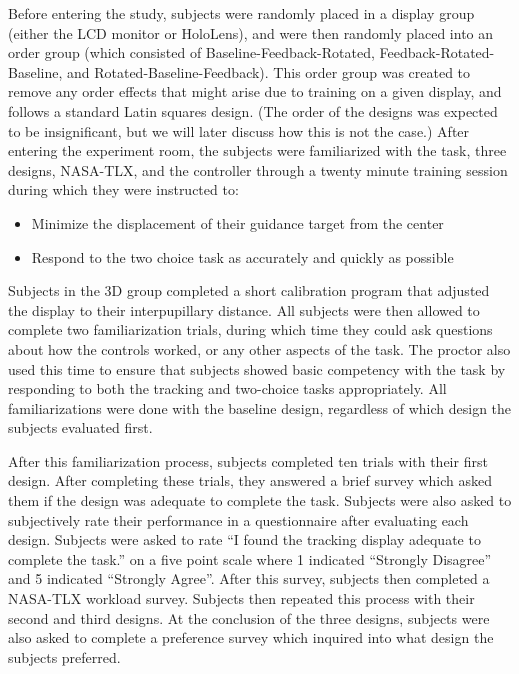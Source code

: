 Before entering the study, subjects were randomly placed in a display group (either the LCD monitor or HoloLens), and were then randomly placed into an order group (which consisted of Baseline-Feedback-Rotated, Feedback-Rotated-Baseline, and Rotated-Baseline-Feedback).
This order group was created to remove any order effects that might arise due to training on a given display, and follows a standard Latin squares design.
(The order of the designs was expected to be insignificant, but we will later discuss how this is not the case.)
After entering the experiment room, the subjects were familiarized with the task, three designs, NASA-TLX, and the controller through a twenty minute training session during which they were instructed to:
\begin{itemize}
    \item Minimize the displacement of their guidance target from the center
    \item Respond to the two choice task as accurately and quickly as possible
\end{itemize}

Subjects in the 3D group completed a short calibration program that adjusted the display to their interpupillary distance.
All subjects were then allowed to complete two familiarization trials, during which time they could ask questions about how the controls worked, or any other aspects of the task.
The proctor also used this time to ensure that subjects showed basic competency with the task by responding to both the tracking and two-choice tasks appropriately.
All familiarizations were done with the baseline design, regardless of which design the subjects evaluated first.

After this familiarization process, subjects completed ten trials with their first design.
After completing these trials, they answered a brief survey which asked them if the design was adequate to complete the task.
Subjects were also asked to subjectively rate their performance in a questionnaire after evaluating each design.
Subjects were asked to rate ``I found the tracking display adequate to complete the task.'' on a five point scale where 1 indicated ``Strongly Disagree'' and 5 indicated ``Strongly Agree''.
After this survey, subjects then completed a NASA-TLX workload survey.
Subjects then repeated this process with their second and third designs.
At the conclusion of the three designs, subjects were also asked to complete a preference survey which inquired into what design the subjects preferred.

